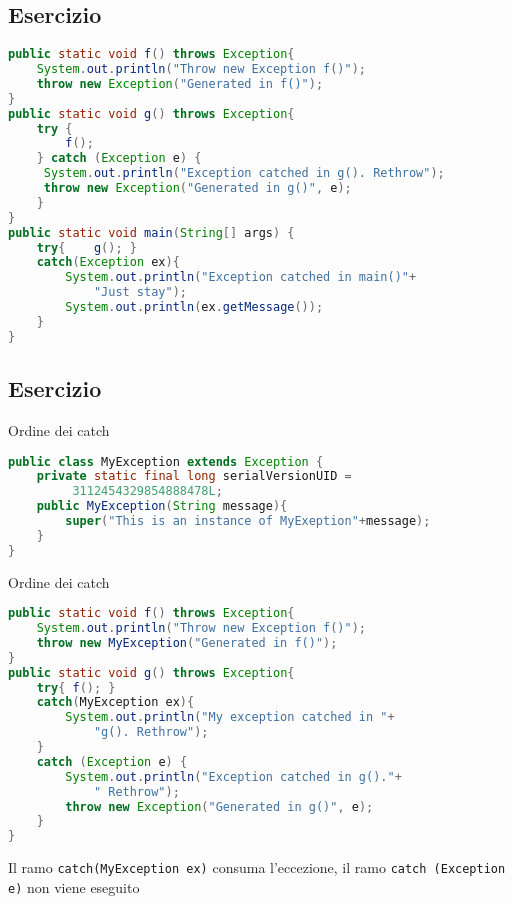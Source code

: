 \documentclass{article}
\begin{document}
\subsection{Esercizio}


\begin{lstlisting}[language=Java]
public static void f() throws Exception{
    System.out.println("Throw new Exception f()");
    throw new Exception("Generated in f()");
}
public static void g() throws Exception{
    try {
        f();
    } catch (Exception e) {
     System.out.println("Exception catched in g(). Rethrow");
     throw new Exception("Generated in g()", e);
    }
}
public static void main(String[] args) {
    try{    g(); }
    catch(Exception ex){
        System.out.println("Exception catched in main()"+
            "Just stay");
        System.out.println(ex.getMessage());
    }
}
\end{lstlisting}

\subsection{Esercizio}

Ordine dei catch
\begin{lstlisting}[language=Java]
public class MyException extends Exception {
    private static final long serialVersionUID =
         3112454329854888478L;
    public MyException(String message){
        super("This is an instance of MyExeption"+message);
    }
}
\end{lstlisting}

Ordine dei catch
\begin{lstlisting}[language=Java]
public static void f() throws Exception{
    System.out.println("Throw new Exception f()");
    throw new MyException("Generated in f()");
}
public static void g() throws Exception{
    try{ f(); }
    catch(MyException ex){
        System.out.println("My exception catched in "+
            "g(). Rethrow");
    }
    catch (Exception e) {
        System.out.println("Exception catched in g()."+
            " Rethrow");
        throw new Exception("Generated in g()", e);
    }
}
\end{lstlisting}
Il ramo \texttt{catch(MyException ex)} consuma l'eccezione, il ramo \texttt{catch (Exception e)} non viene eseguito
\end{document}
